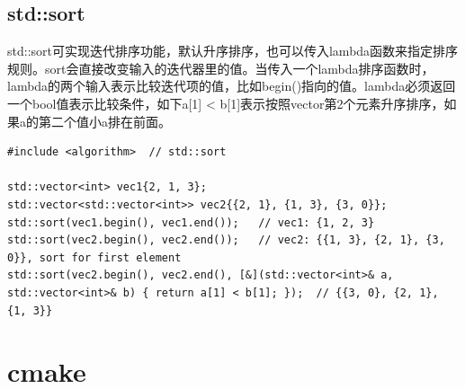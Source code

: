 \documentclass[12pt]{book}
\begin{document}
\subsection{std::sort}
std::sort可实现迭代排序功能，默认升序排序，也可以传入lambda函数来指定排序规则。sort会直接改变输入的迭代器里的值。当传入一个lambda排序函数时，lambda的两个输入表示比较迭代项的值，比如begin()指向的值。lambda必须返回一个bool值表示比较条件，如下a[1] < b[1]表示按照vector第2个元素升序排序，如果a的第二个值小a排在前面。
\begin{lstlisting}
#include <algorithm>  // std::sort

std::vector<int> vec1{2, 1, 3};
std::vector<std::vector<int>> vec2{{2, 1}, {1, 3}, {3, 0}};
std::sort(vec1.begin(), vec1.end());   // vec1: {1, 2, 3}
std::sort(vec2.begin(), vec2.end());   // vec2: {{1, 3}, {2, 1}, {3, 0}}, sort for first element
std::sort(vec2.begin(), vec2.end(), [&](std::vector<int>& a, std::vector<int>& b) { return a[1] < b[1]; });  // {{3, 0}, {2, 1}, {1, 3}}
\end{lstlisting}

\section{cmake}
\end{document}

